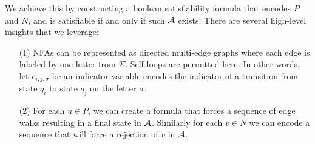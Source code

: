 We achieve this by constructing a boolean satisfiability formula
that encodes \(P\) and \(N\),
and is satisfiable if and only if such \(\mathcal{A}\) exists.
There are several high-level insights that we leverage:
\begin{enumerate}
  \item[(1)]
    NFAs can be represented as directed multi-edge graphs
    where each edge is labeled by one letter from \(\Sigma\).
    Self-loops are permitted here.
    In other words, let \(e_{i, j, \sigma}\) be an indicator
    variable encodes the indicator of a transition from state \(q_i\)
    to state \(q_j\) on the letter \(\sigma\).

  \item[(2)]
    For each \(u \in P\),
    we can create a formula that forces a sequence of edge walks
    resulting in a final state in \(\mathcal{A}\).
    Similarly for each \(v \in N\) we can encode a sequence that will force
    a rejection of \(v\) in \(\mathcal{A}\).

\end{enumerate}

